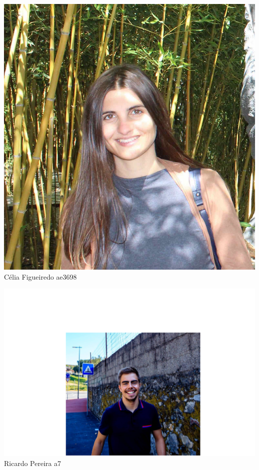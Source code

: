 \begin{titlepage}
\begin{center}
\noindent\begin{minipage}[b]{.1\textwidth}
	\includegraphics[scale=0.1]{celia}
	\small{Célia Figueiredo ae3698}
\end{minipage} 
\hfill
\begin{minipage}[b]{.1\textwidth}
	\includegraphics[scale=0.1]{squirtle}
	\small{Ricardo Pereira a7}
\end{minipage}
\hfill
\begin{minipage}[b]{.2\textwidth}

\end{minipage}
\end{center}
\end{titlepage}
